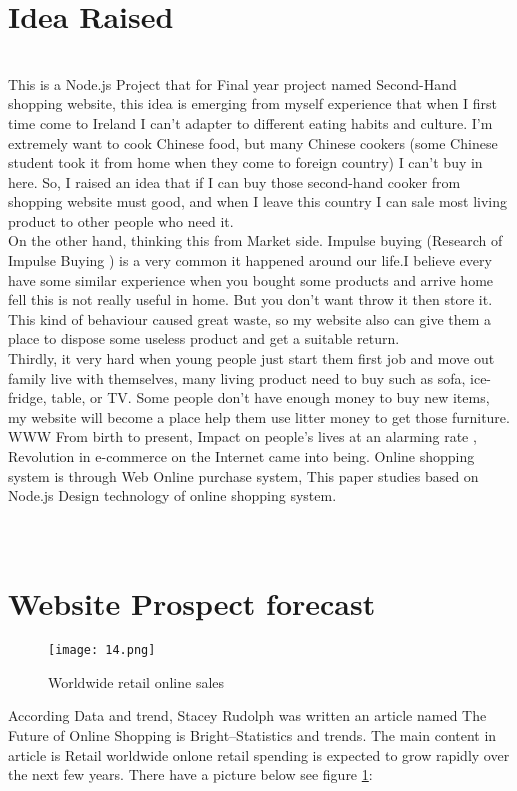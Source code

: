 \section{Idea Raised}
\\
This is a Node.js Project that for Final year project named Second-Hand shopping website, this idea is emerging from myself experience that when I first time come to Ireland I can't adapter to different eating habits and culture. I'm extremely want to cook Chinese food, but many Chinese cookers (some Chinese student took it from home when they come to foreign country) I can't buy in here. So, I raised an idea that if I can buy those second-hand cooker from shopping website must good, and when I leave this country I can sale most living product to other people who need it.\\ 
On the other hand, thinking this from Market side. Impulse buying (Research of Impulse Buying \cite{4}) is a very common it happened around our life.I believe every have some similar experience when you bought some products and arrive home fell this is not really useful in home. But you don't want throw it then store it. This kind of behaviour caused great waste, so my website also can give them a place to dispose some useless product and get a suitable return.\\
Thirdly, it very hard when young people just start them first job and move out family live with themselves, many living product need to buy such as sofa, ice-fridge, table, or TV. Some people don't have enough money to buy new items, my website will become a place help them use litter money to get those furniture. 
WWW From birth to present, Impact on people's lives at an alarming rate , Revolution in e-commerce on the Internet came into being. Online shopping system is through Web Online purchase system, This paper studies based on Node.js Design technology of online shopping system.\\
\\
\\
\section{Website Prospect forecast} 
\begin{figure}[h]
	\centering
	\texttt{[image: 14.png]}
	\caption{Worldwide retail online sales}
	\label{fig:1 cubed graph}
\end{figure}
According Data and trend, Stacey Rudolph \cite{3} was written an article named The Future of Online Shopping is Bright--Statistics and trends. The main content in article is Retail worldwide onlone retail spending is expected to grow rapidly over the next few years. There have a picture below see figure \ref{fig:1 cubed graph}:
\\

